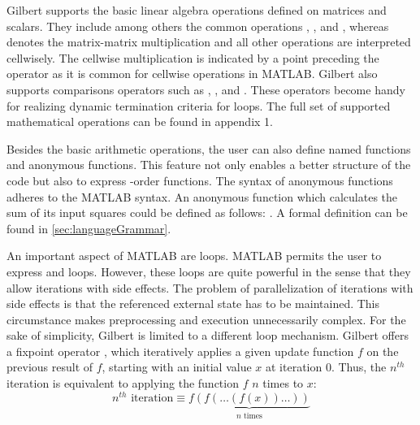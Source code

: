 Gilbert supports the basic linear algebra operations defined on matrices and scalars.
They include among others the common operations \code{+}, \code{-}, \code{/} and \code{*}, whereas \code{*} denotes the matrix-matrix multiplication and all other operations are interpreted cellwisely.
The cellwise multiplication is indicated by a point preceding the operator as it is common for cellwise operations in MATLAB.
Gilbert also supports comparisons operators such as \code{>}, \code{>=}, \code{==} and \code{\textasciitilde=}.
These operators become handy for realizing dynamic termination criteria for loops.
The full set of supported mathematical operations can be found in appendix 1.

Besides the basic arithmetic operations, the user can also define named functions and anonymous functions.
This feature not only enables a better structure of the code but also to express -order functions.
The syntax of anonymous functions adheres to the MATLAB syntax.
An anonymous function which calculates the sum of its input squares could be defined as follows: .
A formal definition can be found in \cref{sec:languageGrammar}.

An important aspect of MATLAB are loops.
MATLAB permits the user to express  and  loops.
However, these loops are quite powerful in the sense that they allow iterations with side effects.
The problem of parallelization of iterations with side effects is that the referenced external state has to be maintained.
This circumstance makes preprocessing and execution unnecessarily complex.
For the sake of simplicity, Gilbert is limited to a different loop mechanism.
Gilbert offers a fixpoint operator , which iteratively applies a given update function $f$ on the previous result of $f$, starting with an initial value $x$ at iteration $0$.
Thus, the $n^{th}$ iteration is equivalent to applying the function $f$ $n$ times to $x$: 
\begin{displaymath}
	n^{th}\text{ iteration}\equiv\underbrace{f(f(\ldots(f(x))\ldots))}_{\text{$n$ times}}
\end{displaymath}

